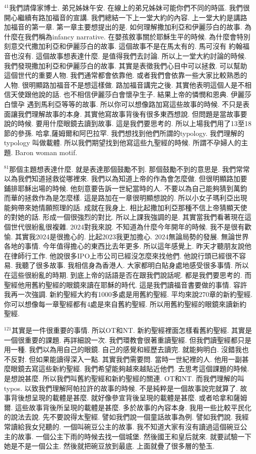\documentclass{book}
\begin{document}
$^{41}$我們請偉家博士.
弟兄姊妹午安.
在線上的弟兄姊妹可能你們不同的時區.
我們很開心繼續有路加福音的宣講.
我們總結一下上一堂大約的內容.
上一堂大約是講路加福音的第一章.
第一章主要想提出的是.
如何理解撒加利亞和伊麗莎白的故事.
為什麼在我們稱為infancy narrative.
在嬰孩敘事關於耶穌生平的時候.
為什麼會特別刻意交代撒加利亞和伊麗莎白的故事.
這個故事不是在馬太有的.
馬可沒有 約翰福音也沒有.
這個故事想表達什麼.
是值得我們去討論.
所以上一堂大約討論的時候.
我們發現撒加利亞和伊麗莎白的故事.
其實是表徵我們心目中可以拯救.
可以幫助這個世代的重要人物.
我們通常都會依靠他.
或者我們會依靠一些大家比較熟悉的人物.
很明顯路加福音不是想這樣做.
路加福音講完之後.
其實他表明這個人是不相信天使跟他說的話.
也不相信伊麗莎白會懷孕生子.
結果上帝的憐憫和恩典.
伊麗莎白懷孕 遇到馬利亞等等的故事.
所以你可以想像路加寫這些故事的時候.
不只是表面讓我們理解故事的本身.
其實他寫故事背後有很多東西想說.
但問題是當故事要說的時候.
要用什麼眼鏡去讀到故事.
這是我們要思考的.
所以上場我們用了13至18節的參孫.
哈拿,薩姆爾和阿巴拉罕.
我們想找到他們所謂的typology.
我們理解的typology 叫做載體.
所以我們期望找到他寫這些九聖經的時候.
所謂不孕婦人的主題.
Baron woman motif.

$^{81}$那個主題想表達什麼.
就是表達那個鼓勵不到.
那個鼓勵不到的意思是.
我們常常以為我們知道拯救從哪裡來.
我們以為知道上帝的作為會怎麼做.
但很明顯路加要鋪排耶穌出場的時候.
他刻意要告訴一世紀當時的人.
不要以為自己能夠猜到萬鈞而華的拯救作為是怎麼樣.
這是路加在一章很明顯想說的.
所以小女子瑪利亞出現能夠帶來她情願照理的話.
成就在我身上.
相比起撒加利亞那種不信上帝猜顯天使的對她的話.
形成一個很強烈的對比.
所以上課我強調的是.
其實當我們看著現在這個世代很紛亂很複雜.
2024對我來說.
不知道為什麼今年開年的時候.
我不是很有歡愉.
其實我2024是很擔心的.
比起2023我更加擔心.
2024無論局勢的發展.
無論世界各地的事情.
今年值得擔心的東西比去年更多.
所以這年感覺上.
昨天才聽朋友說他在律師行工作.
他說很多IPO上市公司已經沒怎麼來找他們.
他說行頭已經很不容易.
我聽了很多故事.
我相信身為香港人.
大家都明白貼身處地感受很多事情.
所以在這些很紛亂的時期.
到底上帝的話語是否在跟我們說話呢.
都是我們要思考的.
而聖經他用舊約聖經的眼鏡來讀在耶穌的時代.
這是我們讀福音書要做的事情.
容許我再一次強調.
新約聖經大約有1000多處是用舊約聖經.
平均來說270章的新約聖經.
你可以想像每一章聖經都有4處是來自舊約聖經.
所以用舊約聖經的眼鏡來讀新約聖經.

$^{121}$其實是一件很重要的事情.
所以OT和NT.
新約聖經裡面怎樣看舊約聖經.
其實是一個很重要的課題.
再詳細說一次.
我們環教會很著重讀聖經.
但我們讀聖經都只是用一種.
我們以為用自己的眼鏡.
自己的感覺和經歷去讀完.
就能夠明白.
沒錯我也不反對.
但如果能讀得深入一點.
其實我們需要問.
當時一世紀裡的人.
他用一副甚麼眼鏡去寫這些新約聖經.
我們希望能夠越來越貼近他們.
去思考這個課題的時候.
是想說甚麼.
所以我們叫舊約聖經和新約聖經的關連.
OT和NT.
而我們理解的叫typos.
以致我們理解阿帕拉許的故事的時候.
不是純粹是一個故事說完就算了.
故事背後想呈現的載體是甚麼.
就好像參宣背後呈現的載體是甚麼.
或者哈拿和薩姆爾.
這些故事背後所呈現的載體是甚麼.
多於故事的內容本身.
我用一些比較平民化的說法去說.
先不要說得太聖經.
譬如我們說一個童話故事為例.
譬如我們說.
我經常讀給我女兒聽的.
一個叫碗豆公主的故事.
我不知道大家有沒有讀過這個碗豆公主的故事.
一個公主下雨的時候去找一個城堡.
然後國王和皇后就來.
就要試驗一下她是不是一個公主.
然後就把碗豆放到最底.
上面就疊了很多層的墊玉.
\end{document}
